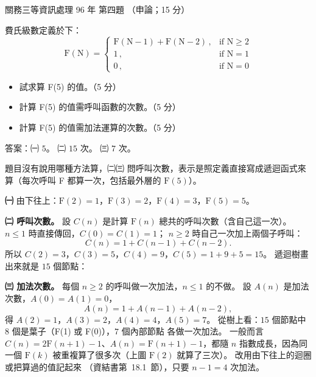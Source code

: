 \begin{pastexam}[label={px:gw3-096-ds-04}]{關務三等資訊處理 96 年 第四題}
（申論；15 分）

費氏級數定義於下：
\[
\mathrm{F}(\mathrm{N}) = \begin{cases} \mathrm{F}(\mathrm{N} - 1) + \mathrm{F}(\mathrm{N} - 2)\,, & \text{if } \mathrm{N} \ge 2 \\
1\,, & \text{if } \mathrm{N} = 1 \\ 0\,, & \text{if } \mathrm{N} = 0 \end{cases}
\]
\begin{itemize}[leftmargin=2.2em, nosep]
\item[㈠] 試求算 F(5) 的值。（5 分）
\item[㈡] 計算 F(5) 的值需呼叫函數的次數。（5 分）
\item[㈢] 計算 F(5) 的值需加法運算的次數。（5 分）
\end{itemize}
\end{pastexam}

\begin{pastsoln}
答案：㈠ $5$。 ㈡ $15$ 次。 ㈢ $7$ 次。

題目沒有說用哪種方法算，㈡㈢ 問呼叫次數，表示是照定義直接寫成遞迴函式來算（每次呼叫 F 都算一次，包括最外層的
$\mathrm{F}(5)$）。

\textbf{㈠} 由下往上：$\mathrm{F}(2) = 1$，$\mathrm{F}(3) = 2$，$\mathrm{F}(4) = 3$，$\mathrm{F}(5) = 5$。

\textbf{㈡ 呼叫次數。} 設 $C(n)$ 是計算 $\mathrm{F}(n)$ 總共的呼叫次數（含自己這一次）。 $n \le 1$ 時直接傳回，$C(0) = C(1) = 1$；
$n \ge 2$ 時自己一次加上兩個子呼叫：
\[
C(n) = 1 + C(n - 1) + C(n - 2).
\]
所以 $C(2) = 3$，$C(3) = 5$，$C(4) = 9$，$C(5) = 1 + 9 + 5 = 15$。 遞迴樹畫出來就是 $15$ 個節點：
\begin{center}
\end{center}

\textbf{㈢ 加法次數。} 每個 $n \ge 2$ 的呼叫做一次加法，$n \le 1$ 的不做。 設 $A(n)$ 是加法次數，$A(0) = A(1) = 0$，
\[
A(n) = 1 + A(n - 1) + A(n - 2),
\]
得 $A(2) = 1$，$A(3) = 2$，$A(4) = 4$，$A(5) = 7$。 從樹上看：$15$ 個節點中 $8$ 個是葉子（F(1) 或 F(0)），$7$ 個內部節點
各做一次加法。 一般而言 $C(n) = 2\mathrm{F}(n + 1) - 1$、$A(n) = \mathrm{F}(n + 1) - 1$，都隨 $n$ 指數成長，因為同一個
$\mathrm{F}(k)$ 被重複算了很多次（上圖 $\mathrm{F}(2)$ 就算了三次）。 改用由下往上的迴圈或把算過的值記起來
（資結書第~18.1~節），只要 $n - 1 = 4$ 次加法。
\end{pastsoln}

